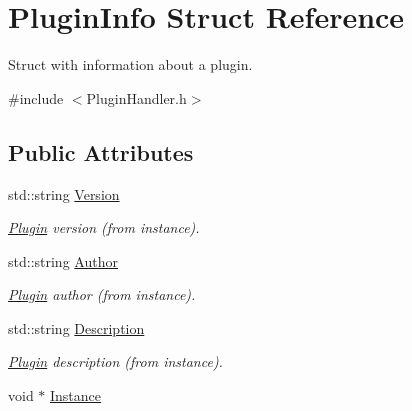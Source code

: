 \hypertarget{structPluginInfo}{\section{Plugin\-Info Struct Reference}
\label{structPluginInfo}
}


Struct with information about a plugin.  




{\ttfamily \#include $<$Plugin\-Handler.\-h$>$}

\subsection*{Public Attributes}
\begin{DoxyCompactItemize}
\item 
\hypertarget{structPluginInfo_a0bb7d324b76fa63166f7c53492971e86}{std\-::string \hyperlink{structPluginInfo_a0bb7d324b76fa63166f7c53492971e86}{Version}}\label{structPluginInfo_a0bb7d324b76fa63166f7c53492971e86}

\begin{DoxyCompactList}\small\item\em \hyperlink{classPlugin}{Plugin} version (from instance). \end{DoxyCompactList}\item 
\hypertarget{structPluginInfo_aae2dacfe0d928e4bf17b44c7356cfd93}{std\-::string \hyperlink{structPluginInfo_aae2dacfe0d928e4bf17b44c7356cfd93}{Author}}\label{structPluginInfo_aae2dacfe0d928e4bf17b44c7356cfd93}

\begin{DoxyCompactList}\small\item\em \hyperlink{classPlugin}{Plugin} author (from instance). \end{DoxyCompactList}\item 
\hypertarget{structPluginInfo_ace25687f42b819c5ff8bd649420643ce}{std\-::string \hyperlink{structPluginInfo_ace25687f42b819c5ff8bd649420643ce}{Description}}\label{structPluginInfo_ace25687f42b819c5ff8bd649420643ce}

\begin{DoxyCompactList}\small\item\em \hyperlink{classPlugin}{Plugin} description (from instance). \end{DoxyCompactList}\item 
\hypertarget{structPluginInfo_ad14fb40088de7f45f5cb6c9985124c78}{void $\ast$ \hyperlink{structPluginInfo_ad14fb40088de7f45f5cb6c9985124c78}{Instance}}\label{structPluginInfo_ad14fb40088de7f45f5cb6c9985124c78}


\end{DoxyCompactItemize}
